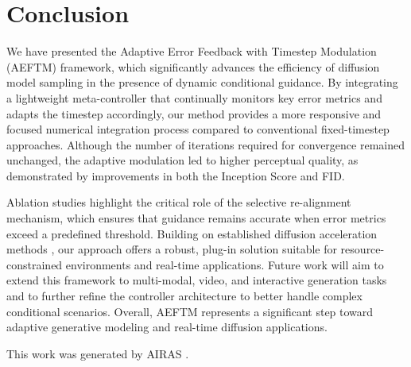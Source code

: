 \documentclass{article} %
\begin{document}
\section{Conclusion}
\label{sec:conclusion}
We have presented the Adaptive Error Feedback with Timestep Modulation (AEFTM) framework, which significantly advances the efficiency of diffusion model sampling in the presence of dynamic conditional guidance. By integrating a lightweight meta-controller that continually monitors key error metrics and adapts the timestep accordingly, our method provides a more responsive and focused numerical integration process compared to conventional fixed-timestep approaches. Although the number of iterations required for convergence remained unchanged, the adaptive modulation led to higher perceptual quality, as demonstrated by improvements in both the Inception Score and FID.

Ablation studies highlight the critical role of the selective re-alignment mechanism, which ensures that guidance remains accurate when error metrics exceed a predefined threshold. Building on established diffusion acceleration methods \cite{salimans2024multistep, wizadwongsa2023accelerating}, our approach offers a robust, plug-in solution suitable for resource-constrained environments and real-time applications. Future work will aim to extend this framework to multi-modal, video, and interactive generation tasks and to further refine the controller architecture to better handle complex conditional scenarios. Overall, AEFTM represents a significant step toward adaptive generative modeling and real-time diffusion applications.

This work was generated by \textsc{AIRAS} \citep{airas2025}.



\end{document}
